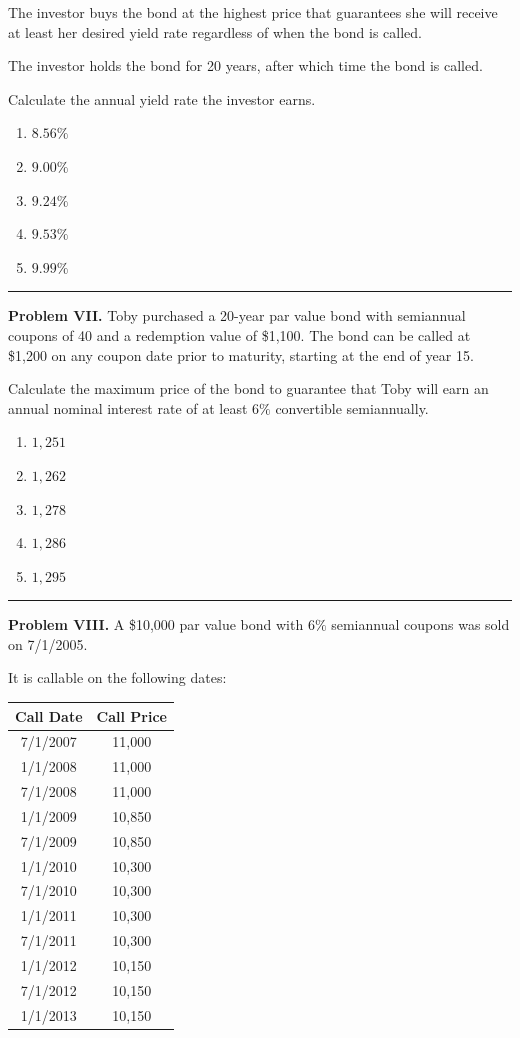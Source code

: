 \documentclass[11pt]{article}
\begin{document}
The investor buys the bond at the highest price that guarantees she will receive at least her desired yield rate regardless of when the bond is called.

The investor holds the bond for 20 years, after which time the bond is called.

Calculate the annual yield rate the investor earns.

\begin{enumerate}[label=\Alph*.]
    \item \(8.56\%\)
    \item \(9.00\%\)
    \item \(9.24\%\)
    \item \(9.53\%\)
    \item \(9.99\%\)
\end{enumerate}

\medskip
\hrule

\textbf{Problem VII.} Toby purchased a 20-year par value bond with semiannual coupons of 40 and a redemption value of \$1{,}100. The bond can be called at \$1{,}200 on any coupon date prior to maturity, starting at the end of year 15.

Calculate the maximum price of the bond to guarantee that Toby will earn an annual nominal interest rate of at least \(6\%\) convertible semiannually.

\begin{enumerate}[label=\Alph*.]
    \item \(1{,}251\)
    \item \(1{,}262\)
    \item \(1{,}278\)
    \item \(1{,}286\)
    \item \(1{,}295\)
\end{enumerate}

\medskip
\hrule

\textbf{Problem VIII.} A \$10{,}000 par value bond with \(6\%\) semiannual coupons was sold on 7/1/2005.

It is callable on the following dates:

\begin{center}
\begin{tabular}{|c|c|}
\hline
\textbf{Call Date} & \textbf{Call Price} \\
\hline
7/1/2007 & 11{,}000 \\
1/1/2008 & 11{,}000 \\
7/1/2008 & 11{,}000 \\
1/1/2009 & 10{,}850 \\
7/1/2009 & 10{,}850 \\
1/1/2010 & 10{,}300 \\
7/1/2010 & 10{,}300 \\
1/1/2011 & 10{,}300 \\
7/1/2011 & 10{,}300 \\
1/1/2012 & 10{,}150 \\
7/1/2012 & 10{,}150 \\
1/1/2013 & 10{,}150 \\
\hline
\end{tabular}
\end{center}
\end{document}
